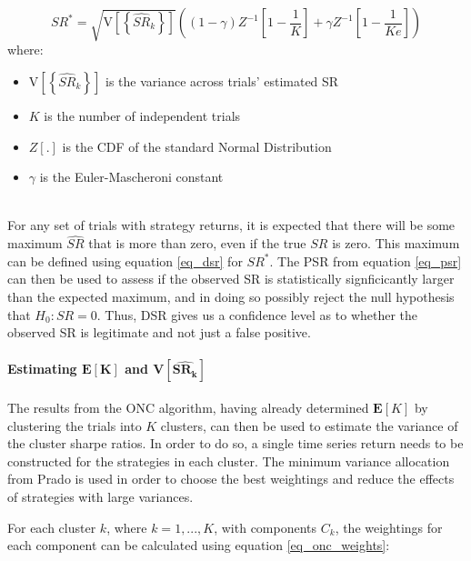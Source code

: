 \documentclass[a4paper,11pt,oneside]{article}
\theoremstyle{plain}
\theoremstyle{definition}
\begin{document}
	\begin{equation}\label{eq_dsr}
	SR^{*}=\sqrt{\mathrm{V}\left[\left\{\widehat{S R}_{k}\right\}\right]}\left((1-\gamma) Z^{-1}\left[1-\frac{1}{K}\right]+\gamma Z^{-1}\left[1-\frac{1}{K e}\right]\right)
	\end{equation}
	where:
	\begin{itemize}
		\item [] $\mathrm{V}\left[\left\{\widehat{S R}_{k}\right\}\right]$ is the variance across trials' estimated SR
		\item [] $K$ is the number of independent trials
		\item [] $Z[.]$ is the CDF of the standard Normal Distribution 
		\item [] $\gamma$ is the Euler-Mascheroni constant
	\end{itemize}
	~\\
	For any set of trials with strategy returns, it is expected that there will be some maximum $\widehat{SR}$ that is more than zero, even if the true $SR$ is zero. This maximum can be defined using equation \ref{eq_dsr} for $SR^*$. The PSR from equation \ref{eq_psr} can then be used to assess if the observed SR is statistically signficicantly larger than the expected maximum, and in doing so possibly reject the null hypothesis that $H_0: SR = 0$. Thus, DSR gives us a confidence level as to whether the observed SR is legitimate and not just a false positive.
	
	\paragraph{Estimating $\mathbf{E}\left[\mathbf{K}\right]$ and $\mathbf{V}\left[\widehat{\mathbf{SR_k}}\right]$}\label{dsr_cluster_estimates}
	
	The results from the ONC algorithm, having already determined $\mathbf{E}\left[K\right]$ by clustering the trials into $K$ clusters, can then be used to estimate the variance of the cluster sharpe ratios. In order to do so, a single time series return needs to be constructed for the strategies in each cluster. The minimum variance allocation from Prado \cite{proadi2016a} is used in order to choose the best weightings and reduce the effects of strategies with large variances.\newline

	For each cluster $k$, where $k = 1, ..., K$, with components $C_k$, the weightings for each component can be calculated using equation \ref{eq_onc_weights}:
	
\end{document}
